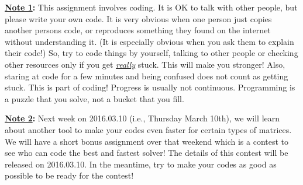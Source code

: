 \documentclass[12pt]{article}
\theoremstyle{plain}
\theoremstyle{definition}
\theoremstyle{remark}
\numberwithin{equation}{section} %
\numberwithin{figure}{section}   %
\begin{document}
% 
% 


\noindent
\textbf{\underline{Note 1}:} This assignment involves coding.  It is OK to talk with other people, but please write your own code.  It is very obvious when one person just copies another persons code, or reproduces something they found on the internet without understanding it.  (It is especially obvious when you ask them to explain their code!)  So, try to code things by yourself, talking to other people or checking other resources only if you get \underline{\textit{really}} stuck.  This will make you stronger!  Also, staring at code for a few minutes and being confused does not count as getting stuck.  This is part of coding!  Progress is usually not continuous.  Programming is a puzzle that you solve, not a bucket that you fill.

\noindent
\textbf{\underline{Note 2}:} Next week on 2016.03.10 (i.e., Thursday March 10th), we will learn about another tool to make your codes even faster for certain types of matrices.  We will have a short bonus assignment over that weekend which is a contest to see who can code the best and fastest solver!  The details of this contest will be released on 2016.03.10.  In the meantime, try to make your codes as good as possible to be ready for the contest!
\end{document}
